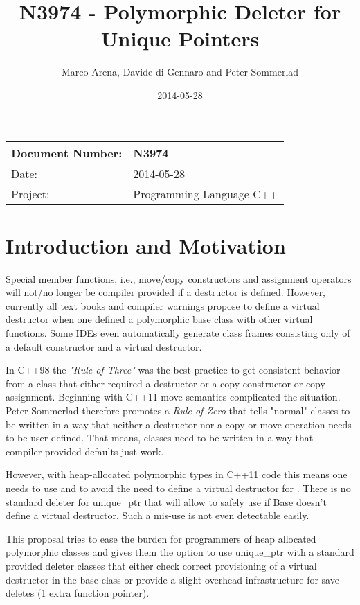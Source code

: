 \documentclass[ebook,11pt,article]{memoir}
\title{N3974 - Polymorphic Deleter for Unique Pointers}
\author{Marco Arena, Davide di Gennaro and Peter Sommerlad}
\date{2014-05-28}                                           %
\begin{document}
\maketitle
\begin{tabular}[t]{|l|l|}\hline 
Document Number: & N3974 \\\hline
Date: & 2014-05-28 \\\hline
Project: & Programming Language C++\\\hline 
\end{tabular}

\chapter{Introduction and Motivation}

Special member functions, i.e., move/copy constructors and assignment operators will not/no longer be compiler provided if a destructor is defined. However, currently all text books and compiler warnings propose to define a virtual destructor when one defined a polymorphic base class with other virtual functions. Some IDEs even automatically generate class frames consisting only of a default constructor and a virtual destructor. 

In C++98 the \emph{"Rule of Three"} was the best practice to get consistent behavior from a class that either required a destructor or a copy constructor or copy assignment. Beginning with C++11 move semantics complicated the situation. Peter Sommerlad therefore promotes a \emph{Rule of Zero} that tells "normal" classes to be written in a way that neither a destructor nor a copy or move operation needs to be user-defined. That means, classes need to be written in a way that compiler-provided defaults just work\texttrademark .

However, with heap-allocated polymorphic types in C++11 code this means one needs to use  and  to avoid the need to define a virtual destructor for . There is no standard deleter for unique_ptr that will allow to safely use  if Base doesn't define a virtual destructor. Such a mis-use is not even detectable easily.

This proposal tries to ease the burden for programmers of heap allocated polymorphic classes and gives them the option to use unique_ptr with a standard provided deleter classes that either check correct provisioning of a virtual destructor in the base class or provide a slight overhead infrastructure for save deletes (1 extra function pointer). 
\end{document}
